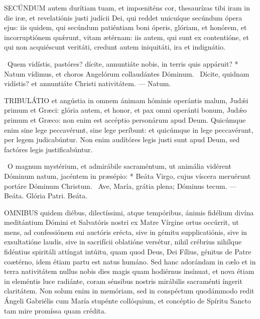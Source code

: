 \lettrine[lines=2]{S}{ECÚNDUM} autem durítiam tuam, et impœniténs cor, thesaurízas tibi iram in die iræ, et revelatiónis justi judícii Dei, qui reddet unicuíque secúndum ópera ejus: iis quidem, qui secúndum patiéntiam boni óperis, glóriam, et honórem, et incorruptiónem quǽrunt, vitam ætérnam: iis autem, qui sunt ex contentióne, et qui non acquiéscunt veritáti, credunt autem iniquitáti, ira et indignátio.

\R\ Quem vidístis, pastóres? dícite, annuntiáte nobis, in terris quis appáruit? * Natum vídimus, et choros Angelórum collaudántes Dóminum. \V\ Dícite, quidnam vidístis? et annuntiáte Christi nativitátem. --- Natum.


\lettrine[lines=2]{T}{RIBULÁTIO} et angústia in omnem ánimam hóminis operántis malum, Judǽi primum et Græci: glória autem, et honor, et pax omni operánti bonum, Judǽo primum et Græco: non enim est accéptio personárum apud Deum. Quicúmque enim sine lege peccavérunt, sine lege períbunt: et quicúmque in lege peccavérunt, per legem judicabúntur. Non enim audítóres legis justi sunt apud Deum, sed factóres legis justificabúntur.

\R\ O magnum mystérium, et admirábile sacraméntum, ut animália vidérent Dóminum natum, jacéntem in præsépio: * Beáta Virgo, cujus víscera meruérunt portáre Dóminum Christum. \V\ Ave, María, grátia plena; Dóminus tecum. --- Beáta. Glória Patri. Beáta.





\lettrine[lines=2]{O}{MNIBUS} quidem diébus, dilectíssimi, atque tempóribus, ánimis fidélium divína meditántium Dómini et Salvatóris nostri ex Matre Vírgine ortus occúrrit, ut mens, ad confessiónem sui auctóris erécta, sive in gémitu supplicatiónis, sive in exsultatióne laudis, sive in sacrifícii oblatióne versétur, nihil crébrius nihílque fidéntius spiritáli attíngat intúitu, quam quod Deus, Dei Fílius, génitus de Patre coætérno, idem étiam partu est natus humáno. Sed hanc adorándam in cælo et in terra nativitátem nullus nobis dies magis quam hodiérnus insínuat, et nova étiam in eleméntis luce radiánte, coram sénsibus nostris mirábilis sacraménti íngerit claritátem. Non solum enim in memóriam, sed in conspéctum quodámmodo redit Ángeli Gabriélis cum María stupénte collóquium, et concéptio de Spíritu Sancto tam mire promíssa quam crédita.

